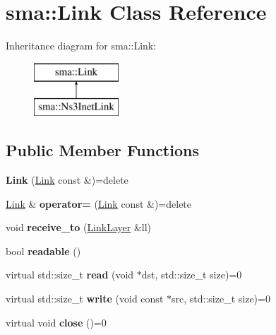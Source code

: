 \hypertarget{classsma_1_1Link}{\section{sma\-:\-:Link Class Reference}
\label{classsma_1_1Link}
}
Inheritance diagram for sma\-:\-:Link\-:\begin{figure}[H]
\begin{center}
\leavevmode
\includegraphics[height=2.000000cm]{classsma_1_1Link}
\end{center}
\end{figure}
\subsection*{Public Member Functions}
\begin{DoxyCompactItemize}
\item 
\hypertarget{classsma_1_1Link_aa41c72ed9f74728df6c0dda4730af198}{{\bfseries Link} (\hyperlink{classsma_1_1Link}{Link} const \&)=delete}\label{classsma_1_1Link_aa41c72ed9f74728df6c0dda4730af198}

\item 
\hypertarget{classsma_1_1Link_ab778fe1e2040195082814ef9e851669e}{\hyperlink{classsma_1_1Link}{Link} \& {\bfseries operator=} (\hyperlink{classsma_1_1Link}{Link} const \&)=delete}\label{classsma_1_1Link_ab778fe1e2040195082814ef9e851669e}

\item 
\hypertarget{classsma_1_1Link_ae78ebf16997f24cca6ca4d76ddffa3c4}{void {\bfseries receive\-\_\-to} (\hyperlink{classsma_1_1LinkLayer}{Link\-Layer} \&ll)}\label{classsma_1_1Link_ae78ebf16997f24cca6ca4d76ddffa3c4}

\item 
\hypertarget{classsma_1_1Link_ac7ab2e31016fbdce38147354112d625d}{bool {\bfseries readable} ()}\label{classsma_1_1Link_ac7ab2e31016fbdce38147354112d625d}

\item 
\hypertarget{classsma_1_1Link_a0b4b817cc3fa0d8ce46e11fa0719b600}{virtual std\-::size\-\_\-t {\bfseries read} (void $\ast$dst, std\-::size\-\_\-t size)=0}\label{classsma_1_1Link_a0b4b817cc3fa0d8ce46e11fa0719b600}

\item 
\hypertarget{classsma_1_1Link_a1b81ed7fa62cb16c9eef3d7c1298815f}{virtual std\-::size\-\_\-t {\bfseries write} (void const $\ast$src, std\-::size\-\_\-t size)=0}\label{classsma_1_1Link_a1b81ed7fa62cb16c9eef3d7c1298815f}

\item 
\hypertarget{classsma_1_1Link_a35f866adef2421b35b9d62cd44af6241}{virtual void {\bfseries close} ()=0}\label{classsma_1_1Link_a35f866adef2421b35b9d62cd44af6241}

\end{DoxyCompactItemize}
